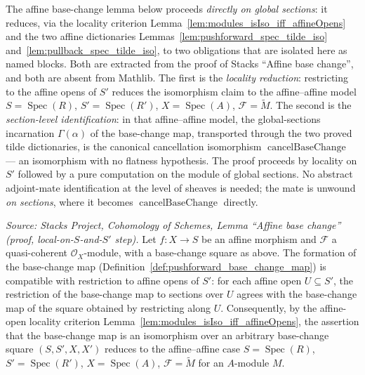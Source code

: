 The affine base-change lemma below proceeds \emph{directly on global sections}: it
reduces, via the locality criterion
Lemma~\ref{lem:modules_isIso_iff_affineOpens} and the two affine dictionaries
Lemmas~\ref{lem:pushforward_spec_tilde_iso} and~\ref{lem:pullback_spec_tilde_iso},
to two obligations that are isolated here as named blocks. Both are extracted from
the proof of Stacks ``Affine base change'', and both are absent from Mathlib. The
first is the \emph{locality reduction}: restricting to the affine opens of \(S'\)
reduces the isomorphism claim to the affine--affine model
\(S = \operatorname{Spec}(R)\), \(S' = \operatorname{Spec}(R')\),
\(X = \operatorname{Spec}(A)\), \(\mathcal{F} = \widetilde{M}\). The second is the
\emph{section-level identification}: in that affine--affine model, the global-sections
incarnation \(\Gamma(\alpha)\) of the base-change map, transported through the two
proved tilde dictionaries, is the canonical cancellation isomorphism
\(\operatorname{cancelBaseChange}\) — an isomorphism with no flatness hypothesis.
The proof proceeds by locality on \(S'\) followed by a pure computation on the module
of global sections. No abstract adjoint-mate identification at the level of sheaves is
needed; the mate is unwound \emph{on sections}, where it becomes
\(\operatorname{cancelBaseChange}\) directly.

\begin{lemma}



  \label{lem:base_change_map_affine_local}
  \textit{Source: Stacks Project, Cohomology of Schemes, Lemma ``Affine base
  change'' (proof, local-on-\(S\)-and-\(S'\) step).}
  Let \(f : X \to S\) be an affine morphism and \(\mathcal{F}\) a quasi-coherent
  \(\mathcal{O}_X\)-module, with a base-change square as above. The formation of the
  base-change map (Definition~\ref{def:pushforward_base_change_map}) is compatible
  with restriction to affine opens of \(S'\): for each affine open \(U \subseteq S'\), the
  restriction of the base-change map to sections over \(U\) agrees with the
  base-change map of the square obtained by restricting along \(U\). Consequently,
  by the affine-open locality criterion
  Lemma~\ref{lem:modules_isIso_iff_affineOpens}, the assertion that the base-change
  map is an isomorphism over an arbitrary base-change square \((S, S', X, X')\)
  reduces to the affine--affine case \(S = \operatorname{Spec}(R)\),
  \(S' = \operatorname{Spec}(R')\), \(X = \operatorname{Spec}(A)\),
  \(\mathcal{F} = \widetilde{M}\) for an \(A\)-module \(M\).

\end{lemma}

